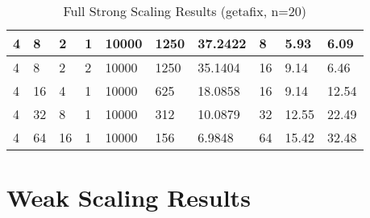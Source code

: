 \begin{appendices}
\begin{table}[H]
\begin{tabular}{|l|l|l|l|l|l|l|l|l|l|}
4 & 8 & 2 & 1 & 10000 & 1250 & 37.2422 & 8 & 5.93 & 6.09 \\ \hline
4 & 8 & 2 & 2 & 10000 & 1250 & 35.1404 & 16 & 9.14 & 6.46 \\ \hline
4 & 16 & 4 & 1 & 10000 & 625 & 18.0858 & 16 & 9.14 & 12.54 \\ \hline
4 & 32 & 8 & 1 & 10000 & 312 & 10.0879 & 32 & 12.55 & 22.49 \\ \hline
4 & 64 & 16 & 1 & 10000 & 156 & 6.9848 & 64 & 15.42 & 32.48 \\ \hline
\end{tabular}
\caption{Full Strong Scaling Results (getafix, n=20)}
\label{tab:strong-results}
\end{table}

\chapter{Weak Scaling Results}
\label{app:weak-res}


\end{appendices}
